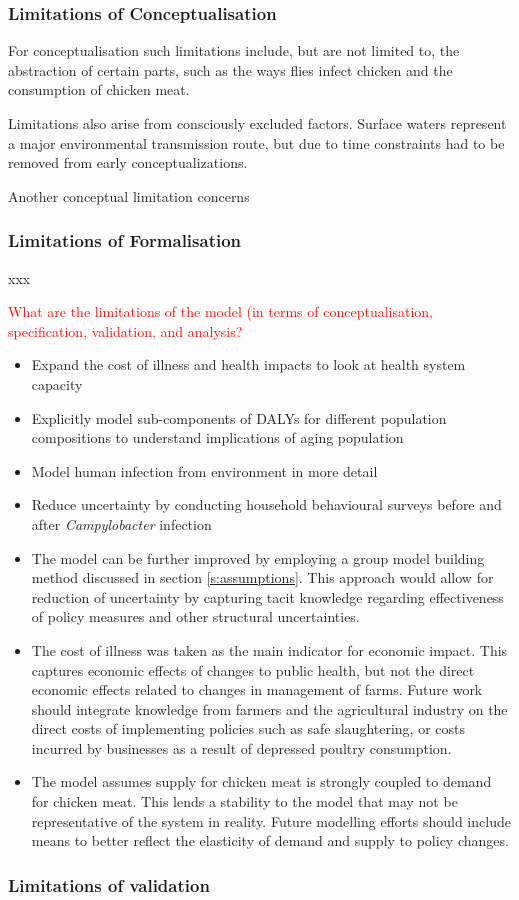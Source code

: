 \subsubsection{Limitations of Conceptualisation}

For conceptualisation such limitations include, but are not limited to, the abstraction of certain parts, such as the ways flies infect chicken and the consumption of chicken meat. 

Limitations also arise from consciously excluded factors. Surface waters represent a major environmental transmission route, but due to time constraints had to be removed from early conceptualizations. 

Another conceptual limitation concerns 

\subsubsection{Limitations of Formalisation}
xxx



\textcolor{red}{What are the limitations of the model (in terms of conceptualisation, specification, validation, and analysis?}
\begin{itemize}
    \item Expand the cost of illness and health impacts to look at health system capacity
    \item Explicitly model sub-components of DALYs for different population compositions to understand implications of aging population
    \item Model human infection from environment in more detail
    \item Reduce uncertainty by conducting household behavioural surveys before and after \textit{Campylobacter} infection
    \item The model can be further improved by employing a group model building method discussed in section \ref{s:assumptions}. This approach would allow for reduction of uncertainty by capturing tacit knowledge regarding effectiveness of policy measures and other structural uncertainties.
    \item The cost of illness was taken as the main indicator for economic impact. This captures economic effects of changes to public health, but not the direct economic effects related to changes in management of farms. Future work should integrate knowledge from farmers and the agricultural industry on the direct costs of implementing policies such as safe slaughtering, or costs incurred by businesses as a result of depressed poultry consumption.
    \item The model assumes supply for chicken meat is strongly coupled to demand for chicken meat. This lends a stability to the model that may not be representative of the system in reality. Future modelling efforts should include means to better reflect the elasticity of demand and supply to policy changes.
\end{itemize}

\subsubsection{Limitations of validation}

